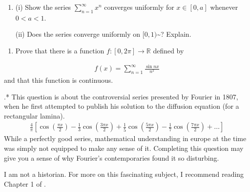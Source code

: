 \documentclass[letterpaper,10pt,english]{jupyterBook}
\begin{document}
\label{\detokenize{Problems:id63}}\begin{enumerate}
%
\setcounter{enumi}{62}
\item {} 
\sphinxAtStartPar
(i) Show the series \(\sum_{n=1}^\infty x^n\) converges uniformly for \(x\in [0,a]\) whenever \(0<a<1\).

\sphinxAtStartPar
(ii) Does the series converge uniformly on \([0,1)\)\textasciitilde{}? Explain.

\end{enumerate}
\label{\detokenize{Problems:id64}}\begin{enumerate}
%
\setcounter{enumi}{63}
\item {} 
\sphinxAtStartPar
Prove that there is a function \(f\colon [0,2\pi] \rightarrow \mathbb{R}\) defined by

\end{enumerate}
\begin{equation*}
\begin{split}
f(x) = \sum_{n=1}^\infty \frac{\sin n x }{n^2}
\end{split}
\end{equation*}
\sphinxAtStartPar
and that this function is continuous.

\label{\detokenize{Problems:id65}}
.* This question is about the controversial series presented by Fourier in 1807, when he first attempted to publish his solution to the diffusion equation (for a rectangular lamina).
\begin{equation}\label{equation:Problems:fourier}
\begin{split}\frac{4}{\pi}\left[\cos\left(\frac{\pi x}{2}\right)-\frac{1}{3}\cos\left(\frac{3\pi x}{2}\right)+\frac{1}{5}\cos\left(\frac{5\pi x}{2}\right)-\frac{1}{7}\cos\left(\frac{7\pi x}{2}\right)+\ldots\right]\end{split}
\end{equation}
\sphinxAtStartPar
While a perfectly good series, mathematical understanding in europe at the time was simply not equipped to make any sense of it. Completing this question may give you a sense of why Fourier’s contemporaries found it so disturbing.

\sphinxAtStartPar
{} I am not a historian. For more on this fascinating subject, I recommend reading Chapter 1 of .
\end{document}
